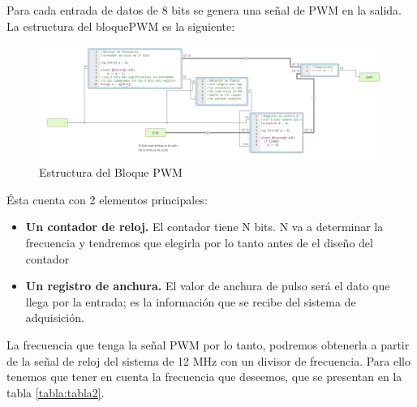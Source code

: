 Para cada entrada de datos de 8 bits se genera una señal de PWM en la salida. La estructura del bloquePWM es la siguiente:

\begin{figure}[H]
	\center
	\includegraphics[scale=0.5]{imagenes/Disenodelsistema/bloquePWM2.png}
	\caption{Estructura del Bloque PWM}
	\label{fig:bloquepwm2}
\end{figure}

Ésta cuenta con 2 elementos principales:

	\begin{itemize}
	\item \textbf{Un contador de reloj.} El contador tiene N bits. N va a determinar la frecuencia y tendremos que elegirla por lo tanto antes de el diseño del contador
	\item \textbf{Un registro de anchura.} El valor de anchura de pulso será el dato que llega por la entrada; es la información que se recibe del sistema de adquisición.
	\end{itemize}

La frecuencia que tenga la señal PWM por lo tanto, podremos obtenerla a partir de la señal de reloj del sistema de 12 MHz con un divisor de frecuencia. Para ello tenemos que tener en cuenta la frecuencia que deseemos, que se presentan en la tabla \ref{tabla:tabla2}.

